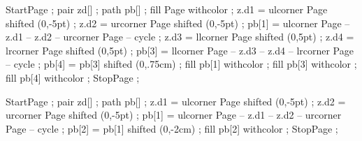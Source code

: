 


\definecolor [a]                [s=.95]
\definecolor [b] 	        [r=.58,g=.58,b=.82]
\definecolor [c]                [r=.2,g=.2,b=.73]
\definecolor [Item]             [r=.2,g=.2,b=.73]


StartPage ;
pair zd[] ;
path pb[] ;
fill Page withcolor  ;
z.d1 = ulcorner Page shifted (0,-5pt) ;
z.d2 = urcorner Page shifted (0,-5pt) ;
pb[1] = ulcorner Page -- z.d1 -- z.d2 -- urcorner Page -- cycle ;
z.d3 = llcorner Page shifted (0,5pt) ;
z.d4 = lrcorner Page shifted (0,5pt) ;
pb[3] = llcorner Page -- z.d3 -- z.d4 -- lrcorner Page -- cycle ;
pb[4] = pb[3] shifted (0,.75cm) ;
fill pb[1] withcolor  ;
fill pb[3] withcolor  ;
fill pb[4] withcolor  ;
StopPage ;
\stopuniqueMPgraphic 

StartPage ;
pair zd[] ;
path pb[] ;
z.d1 = ulcorner Page shifted (0,-5pt) ;
z.d2 = urcorner Page shifted (0,-5pt) ;
pb[1] = ulcorner Page -- z.d1 -- z.d2 -- urcorner Page -- cycle ;
pb[2] = pb[1] shifted (0,-2cm) ;
fill pb[2] withcolor  ;
StopPage ;
\stopuniqueMPgraphic





\setupfooter[color=c,style={\switchtobodyfont[10pt]},strut=yes]


\lecback{\setuplayout[header=1.75cm]\setupfooter[state=start]\setupbackgrounds[page][background={picbackground,lecbackground,slidetitle}]}
\titback{\setuplayout[header=1.75cm]\setupfooter[state=stop]\setupbackgrounds[page][background={picbackground,lecbackground}]}
\picback{\setuplayout[header=0cm]\setupfooter[state=start]\setupbackgrounds[page][background={picbackground}]}
\noback{\setupbackgrounds[page][background=nobackground]}

